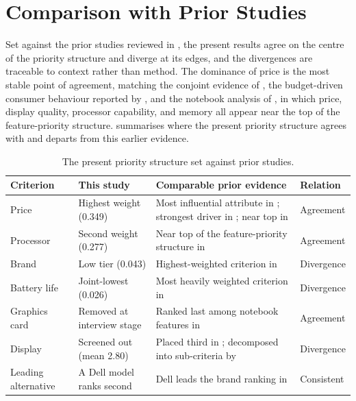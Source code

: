 \section{Comparison with Prior Studies}\label{sec:comparison}

Set against the prior studies reviewed in , the present results
agree on the centre of the priority structure and diverge at its edges, and the
divergences are traceable to context rather than method. The dominance of price is the
most stable point of agreement, matching the conjoint evidence of
\textcite{liao_determinants_2022}, the budget-driven consumer behaviour reported by
\textcite{sostar_assessment_2023}, and the notebook analysis of
\textcite{maghsoudi_hybrid_2026}, in which price, display quality, processor capability,
and memory all appear near the top of the feature-priority structure.
 summarises where the present priority structure agrees with and
departs from this earlier evidence.

\begin{table}[htbp]
  \centering
  \footnotesize
  \setlength{\tabcolsep}{4pt}
  \caption{The present priority structure set against prior studies.}
  \label{tab:prior-comparison}
  \begin{tabularx}{\textwidth}{@{}L{2.3cm}L{2.9cm}Y L{1.9cm}@{}}
    \toprule
    \textbf{Criterion} & \textbf{This study} & \textbf{Comparable prior evidence} & \textbf{Relation} \\
    \midrule
    Price & Highest weight (0.349) & Most influential attribute in \textcite{liao_determinants_2022}; strongest driver in \textcite{sostar_assessment_2023}; near top in \textcite{maghsoudi_hybrid_2026} & Agreement \\
    Processor & Second weight (0.277) & Near top of the feature-priority structure in \textcite{maghsoudi_hybrid_2026} & Agreement \\
    Brand & Low tier (0.043) & Highest-weighted criterion in \textcite{sonmez_cakir_determination_2020} & Divergence \\
    Battery life & Joint-lowest (0.026) & Most heavily weighted criterion in \textcite{weng_siew_lam_evaluation_2023} & Divergence \\
    Graphics card & Removed at interview stage & Ranked last among notebook features in \textcite{maghsoudi_hybrid_2026} & Agreement \\
    Display & Screened out (mean 2.80) & Placed third in \textcite{maghsoudi_hybrid_2026}; decomposed into sub-criteria by \textcite{sonmez_cakir_determination_2020} & Divergence \\
    Leading alternative & A Dell model ranks second & Dell leads the brand ranking in \textcite{gaur_application_2023} & Consistent \\
    \bottomrule
  \end{tabularx}
\end{table}

